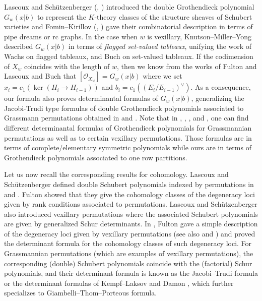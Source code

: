 \documentclass[12pt, reqno,sumlimits]{amsart}
\theoremstyle{definition}
\numberwithin{equation}{section}
\newcommand{\scO}{{\mathscr O}}
\begin{document}
Lascoux and Sch{\"u}tzenberger (\cite{Lascoux1}, \cite{LascouxSchutzenberger3}) introduced the double Grothendieck polynomial $G_w(x|b)$ to represent the $K$-theory classes of the structure sheaves of Schubert varieties and Fomin--Kirillov  (\cite{GrothendieckFomin}, \cite{DoubleGrothendieckFomin}) gave their combinatorial description in terms of pipe dreams or rc graphs. In the case when $w$ is vexillary, Knutson--Miller--Yong \cite{KnutsonMillerYong} described $G_w(x|b)$ in terms of \emph{flagged set-valued tableaux}, unifying the work of Wachs \cite{Wachs} on flagged tableaux, and Buch \cite{BuchLRrule} on set-valued tableaux. If the codimension of $X_w$ coincides with the length of $w$, then we know from the works of Fulton and Lascoux \cite{FultonLascoux} and Buch \cite{BuchQuiver} that $[\scO_{X_w}] = G_w(x|b)$ where we set $x_i = c_1(\ker(H_i\to H_{i-1}))$ and $b_i=c_1((E_i/E_{i-1})^{\vee})$. As a consequence, our formula also proves determinantal formulas of $G_w(x|b)$, generalizing the Jacobi-Trudi type formulas of double Grothendieck polynomials associated to Grassmann permutations obtained in \cite{HIMN} and \cite{HudsonMatsumura}. Note that in \cite{Lenart2000}, \cite{KirillovDunkl}, \cite{Kirillov2015}, and \cite{Yeliussizov}, one can find different determinantal formulas of Grothendieck polynomials for Grassmannian permutations as well as to certain vexillary permutations. Those formulas are in terms of complete/elementary symmetric polynomials while ours are in terms of Grothendieck polynomials associated to one row partitions.

Let us now recall the corresponding results for cohomology. Lascoux and Sch{\"u}tzenberger defined double Schubert polynomials indexed by permutations in \cite{ClassesLascoux} and \cite{SchubertLascoux}. Fulton \cite{FlagsFulton} showed that they give the cohomology classes of the degeneracy loci
given by rank conditions associated to permutations. Lascoux and Sch{\"u}tzenberger also introduced vexillary permutations where the associated Schubert polynomials are given by generalized Schur determinants. In \cite{FlagsFulton}, Fulton gave a simple description of the degeneracy loci given by vexillary permutations (see also \cite{AndersonFulton} and \cite{AndersonFulton2}) and proved the determinant formula for the cohomology classes of such degeneracy loci. For Grassmannian permutations (which are examples of vexillary permutations), the corresponding (double) Schubert polynomials coincide with the (factorial) Schur polynomials, and their determinant formula is known as the Jacobi--Trudi formula or the determinant formulas of Kempf--Laksov \cite{KempfLaksov} and Damon \cite{Damon1974}, which further specializes to Giambelli--Thom--Porteous formula.
\end{document}
